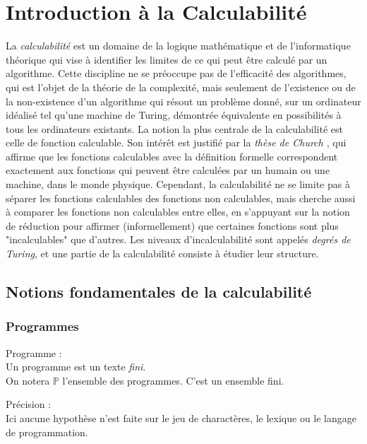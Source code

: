 \chapter{Introduction \`a la Calculabilit\'e}\label{chap:introduction}
    La \emph{calculabilit\'e} est un domaine de la logique mathématique et de l'informatique théorique qui vise à identifier les limites de ce qui peut être calculé par un algorithme. Cette discipline ne se préoccupe pas de l'efficacité des algorithmes, qui est l'objet de la théorie de la complexité, mais seulement de l'existence ou de la non-existence d'un algorithme qui résout un problème donné, sur un ordinateur idéalisé tel qu'une machine de Turing, démontrée équivalente en possibilités à tous les ordinateurs existants. La notion la plus centrale de la calculabilité est celle de fonction calculable. Son intérêt est justifié par la \emph{thèse de Church \autocite{church_unsolvable_1936}}, qui affirme que les fonctions calculables avec la définition formelle correspondent exactement aux fonctions qui peuvent être calculées par un humain ou une machine, dans le monde physique. Cependant, la calculabilité ne se limite pas à séparer les fonctions calculables des fonctions non calculables, mais cherche aussi à comparer les fonctions non calculables entre elles, en s'appuyant sur la notion de réduction pour affirmer (informellement) que certaines fonctions sont plus "incalculables" que d'autres. Les niveaux d'incalculabilité sont appelés \emph{degrés de Turing}, et une partie de la calculabilité consiste à étudier leur structure. 
    
    \section{Notions fondamentales de la calculabilit\'e}\label{sec:notions_fondamentales}
    \subsection{Programmes}
    \begin{definition}
        Programme :\\
        Un programme est un texte \emph{fini}.\\
        On notera \(\mathbb{P}\) l'ensemble des programmes. C'est un ensemble fini.\\
        \begin{Note}
            Précision :\\
            Ici aucune hypoth\`ese n'est faite sur le jeu de charact\`eres, le lexique ou le langage de programmation.
        \end{Note}
    \end{definition}
